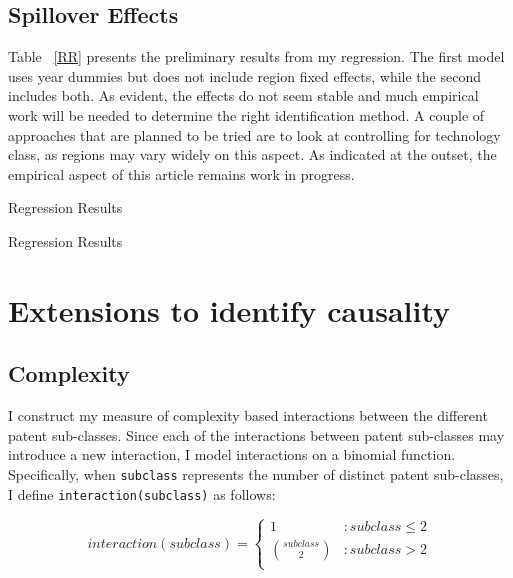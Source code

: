 \documentclass[12pt]{article}
\begin{document}
\subsection{Spillover Effects}
Table ~\ref{RR} presents the preliminary results from my regression. The first model uses year dummies but does not include region fixed effects, while the second includes both. As evident, the effects do not seem stable and much empirical work will be needed to determine the right identification method. A couple of approaches that are planned to be tried are to look at controlling for technology class, as regions may vary widely on this aspect. As indicated at the outset, the empirical aspect of this article remains work in progress.
\begin{table}
\caption{Regression Results}

\label{CC}
\end{table}



\begin{table}
\caption{Regression Results}

\label{CT}
\end{table}

\section{Extensions to identify causality}
\subsection{Complexity}
I construct my measure of complexity based interactions between the different patent sub-classes. Since each of the interactions between patent sub-classes may introduce a new interaction, I model interactions on a binomial function. Specifically, when \verb|subclass| represents the number of distinct patent sub-classes, I define  \verb|interaction(subclass)| as follows:

\begin{displaymath}
   interaction(subclass) = \left\{
     \begin{array}{lr}
       1 & : subclass \leq 2 \\
       \binom{subclass}{2} & : subclass > 2 \\
     \end{array}
   \right.
\end{displaymath} 
\end{document}
